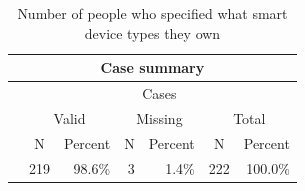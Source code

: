 \begin{table}[!h]
\centering
\begin{tabular}{|l|c|c|c|c|c|c|}
\hline
\multicolumn{7}{|c|}{{\color[HTML]{010205} \textbf{Case summary}}}                                                                                                                                                                                                                                                                                                              \\ \hline
{\color[HTML]{264A60} }                                      & \multicolumn{6}{c|}{{\color[HTML]{264A60} Cases}}                                                                                                                                                                                                                                                                \\ \cline{2-7} 
{\color[HTML]{264A60} }                                      & \multicolumn{2}{c|}{{\color[HTML]{264A60} Valid}}                                                    & \multicolumn{2}{c|}{{\color[HTML]{264A60} Missing}}                                               & \multicolumn{2}{c|}{{\color[HTML]{264A60} Total}}                                                     \\ \cline{2-7} 
\multirow{-3}{*}{{\color[HTML]{264A60} }}                    & {\color[HTML]{264A60} N}                        & {\color[HTML]{264A60} Percent}                     & {\color[HTML]{264A60} N}                      & {\color[HTML]{264A60} Percent}                    & {\color[HTML]{264A60} N}                        & {\color[HTML]{264A60} Percent}                      \\ \hline
\cellcolor[HTML]{E0E0E0}{\color[HTML]{264A60} Smart devices} & \multicolumn{1}{r|}{{\color[HTML]{010205} 219}} & \multicolumn{1}{r|}{{\color[HTML]{010205} 98.6\%}} & \multicolumn{1}{r|}{{\color[HTML]{010205} 3}} & \multicolumn{1}{r|}{{\color[HTML]{010205} 1.4\%}} & \multicolumn{1}{r|}{{\color[HTML]{010205} 222}} & \multicolumn{1}{r|}{{\color[HTML]{010205} 100.0\%}} \\ \hline
\end{tabular}
\caption{Number of people who specified what smart device types they own}
\label{tab:how_smart_N}
\end{table}

